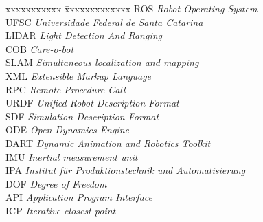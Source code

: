 \ifx\isenglish\undefined
{}
\else
{}
\fi


\begin{tabbing}
xxxxxxxxxxx \= xxxxxxxxxxxxx \kill
\textsc{ROS}            \> \textit{Robot Operating System}\\
\textsc{UFSC} \> \textit{Universidade Federal de Santa Catarina}\\
\textsc{LIDAR}            \> \textit{Light Detection And Ranging}\\
\textsc{COB}            \> \textit{Care-o-bot}\\
\textsc{SLAM}            \> \textit{Simultaneous localization and mapping}\\
\textsc{XML}            \> \textit{Extensible Markup Language}\\
\textsc{RPC}            \> \textit{Remote Procedure Call}\\
\textsc{URDF}            \> \textit{Unified Robot Description Format}\\
\textsc{SDF}            \> \textit{Simulation Description Format}\\
\textsc{ODE} \> \textit{Open Dynamics Engine} \\
\textsc{DART} \> \textit{Dynamic Animation and Robotics Toolkit} \\
\textsc{IMU} \> \textit{Inertial measurement unit} \\
\textsc{IPA} \> \textit{Institut f{\"u}r Produktionstechnik und Automatisierung} \\
\textsc{DOF} \> \textit{Degree of Freedom} \\
\textsc{API} \> \textit{Application Program Interface} \\
\textsc{ICP} \> \textit{Iterative closest point} \\


\end{tabbing}

